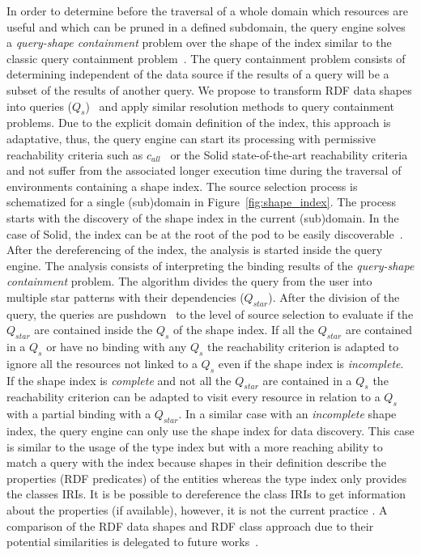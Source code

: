 In order to determine before the traversal of a whole domain which resources are useful and which can be pruned in a defined subdomain, the query engine solves a \emph{query-shape containment} problem over the shape of the index similar to the classic query containment problem~\cite{afariQCE, Spasi2023, Chekol2018}.
The query containment problem consists of determining independent of the data source if the results of a query will be a subset of the results of another query.
We propose to transform RDF data shapes into queries ($Q_{s}$)~\cite{labragayo2017validating, Corman2019, Delva2021} and apply similar resolution methods to query containment problems.
Due to the explicit domain definition of the index, this approach is adaptative, 
thus, the query engine can start its processing with permissive reachability criteria
such as $c_{all}$~\cite{Hartig2012} or the Solid state-of-the-art reachability criteria~\cite{Taelman2023}
and not suffer from the associated longer execution time during the traversal of environments containing a shape index.
The source selection process is schematized for a single (sub)domain in Figure~\ref{fig:shape_index}.
The process starts with the discovery of the shape index in the current (sub)domain.
In the case of Solid, the index can be at the root of the pod to be easily discoverable~.
After the dereferencing of the index, the analysis is started inside the query engine.
The analysis consists of interpreting the binding results of the \emph{query-shape containment} problem.
The algorithm divides the query from the user into multiple star patterns with their dependencies ($Q_{star}$).
After the division of the query, the queries are pushdown~\cite{Stuckenschmidt2004, Yang2021FlexPushdownDBHP} to the level of source selection to evaluate if the $Q_{star}$ are contained inside the $Q_s$ of the shape index.
If all the $Q_{star}$ are contained in a $Q_{s}$ or have no binding with any $Q_{s}$
the reachability criterion is adapted to ignore all the resources not linked to a $Q_{s}$ even if the shape index is \emph{incomplete}.
If the shape index is \emph{complete} and not all the $Q_{star}$ are contained in a $Q_{s}$ the reachability criterion can be adapted
to visit every resource in relation to a $Q_{s}$ with a partial binding with a $Q_{star}$.
In a similar case with an \emph{incomplete} shape index, the query engine can only use the shape index for data discovery.
This case is similar to the usage of the type index but with a more reaching ability to match a query with the index because shapes in their definition describe the properties (RDF predicates) of the entities whereas the type index only provides the classes IRIs.
It is be possible to dereference the class IRIs to get information about the properties (if available), however, it is not the current practice \cite{Taelman2023}.
A comparison of the RDF data shapes and RDF class approach due to their potential similarities is delegated to future works~.

